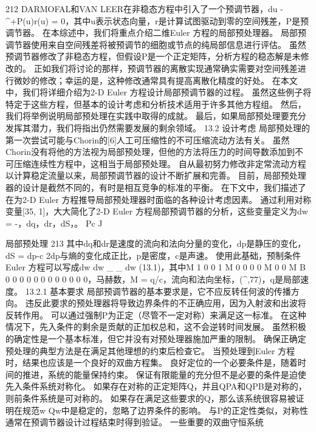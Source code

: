 \documentclass[UTF8,11pt,a4paper,openany,fontset=fandol]{ctexbook}
\begin{document}
212 DARMOFAL和VAN LEER在非稳态方程中引入了一个预调节器，du -\textasciicircum{}+P(u)r(u) = 0，其中u表示状态向量，r是计算试图驱动到零的空间残差，P是预调节器。 在本综述中，我们将重点介绍二维Euler 方程的局部预处理器。 局部预调节器使用来自空间残差将被预调节的细胞或节点的纯局部信息进行评估。 虽然预调节器修改了非稳态方程，但假设P是一个正定矩阵，分析方程的稳态解是未修改的。 正如我们将讨论的那样，预调节器的离散实现通常确实需要对空间残差进行微妙的修改；幸运的是，这种修改通常具有提高离散化精度的好处。 在本文中，我们将详细介绍为2-D Euler 方程设计局部预调节器的过程。 虽然这些例子将特定于这些方程，但基本的设计考虑和分析技术适用于许多其他方程组。 然后，我们将举例说明局部预处理在实践中取得的成就。 最后，如果局部预处理要充分发挥其潜力，我们将指出仍然需要发展的剩余领域。 13.2 设计考虑 局部预处理的第一次尝试可能与Chorin的[6]人工可压缩性的不可压缩流动方法有关。 虽然Chorin没有将他的方法视为局部预处理，但他的方法将压力的时间导数添加到不可压缩连续性方程中，这相当于局部预处理。 自从最初努力修改非定常流动方程以计算稳定流量以来，局部预调节器的设计不断扩展和完善。 目前，局部预处理器的设计是截然不同的，有时是相互竞争的标准的平衡。 在下文中，我们描述了在为2-D Euler 方程推导局部预处理器时面临的各种设计考虑因素。 通过利用对称变量[35, 1]，大大简化了2-D Euler 方程局部预调节器的分析，这些变量定义为dw = -，dq，dr，dS，。 Pc J

局部预处理 213 其中dq和dr是速度的流向和法向分量的变化，dp是静压的变化，dS = dp-c 2dp与熵的变化成正比，p是密度，c是声速。 使用此基础，预制条件Euler 方程可以写成dw dw \_ \_ dw (13.1)，其中M 1 0 0 1 M 0 0 0 0 M 0 0 M B 0 0 0 0 0 0 0 0 0 0 0 0，马赫数，M = q/c，流向和法向坐标，(\textasciicircum{},77)，q是局部速度。 13.2.1 基本要求 局部预调节器的基本要求是，它不应反转任何波的传播方向。 违反此要求的预处理器将导致边界条件的不正确应用，因为入射波和出波将反转作用。 可以通过强制P为正定（尽管不一定对称）来满足这一标准。 在这种情况下，先入条件的剩余是贡献的正加权总和，这不会逆转时间发展。 虽然积极的确定性是一个基本标准，但它并没有对预处理器施加严重的限制。 确保正确定预处理的典型方法是在满足其他理想的约束后检查它。 当预处理到Euler 方程时，结果也应该是一个良好的双曲方程集。 良好定位的一个必要条件是，随着时间的推进，系统的能量保持约束。 保证有限能量的充分但不是必要的条件是迫使先入条件系统对称化。 如果存在对称的正定矩阵Q，并且QPA和QPB是对称的，则前条件系统是可对称的。 如果存在满足这些要求的Q，那么该系统很容易被证明在规范w Qw中是稳定的，忽略了边界条件的影响。 与P的正定性类似，对称性通常在预调节器设计过程结束时得到验证。 一些重要的双曲守恒系统
\end{document}
